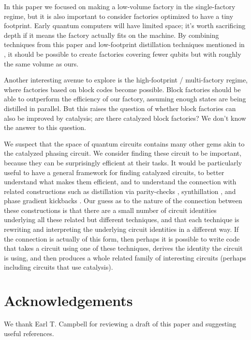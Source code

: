 \documentclass[twocolumn,accepted=2019-03-30]{quantumarticle}
\begin{document}
In this paper we focused on making a low-volume factory in the single-factory regime, but it is also important to consider factories optimized to have a tiny footprint.
Early quantum computers will have limited space; it's worth sacrificing depth if it means the factory actually fits on the machine.
By combining techniques from this paper and low-footprint distillation techniques mentioned in \cite{litinski2018}, it should be possible to create factories covering fewer qubits but with roughly the same volume as ours.

Another interesting avenue to explore is the high-footprint / multi-factory regime, where factories based on block codes become possible.
Block factories should be able to outperform the efficiency of our factory, assuming enough states are being distilled in parallel.
But this raises the question of whether block factories can also be improved by catalysis; are there catalyzed block factories?
We don't know the answer to this question.

We suspect that the space of quantum circuits contains many other gems akin to the catalyzed phasing circuit.
We consider finding these circuit to be important, because they can be surprisingly efficient at their tasks.
It would be particularly useful to have a general framework for finding catalyzed circuits, to better understand what makes them efficient, and to understand the connection with related constructions such as distillation via parity-checks \cite{campbell2018}, synthillation \cite{campbell2017}, and phase gradient kickbacks \cite{kitaev2002, gidney2018, nam2018}.
Our guess as to the nature of the connection between these constructions is that there are a small number of circuit identities underlying all these related but different techniques, and that each technique is rewriting and interpreting the underlying circuit identities in a different way.
If the connection is actually of this form, then perhaps it is possible to write code that takes a circuit using one of these techniques, derives the identity the circuit is using, and then produces a whole related family of interesting circuits (perhaps including circuits that use catalysis).


\section{Acknowledgements}

We thank Earl T. Campbell for reviewing a draft of this paper and suggesting useful references.
\end{document}
